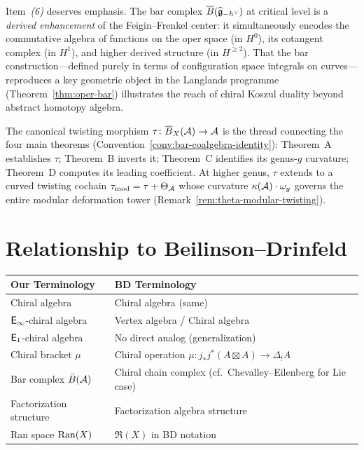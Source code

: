 \begin{remark}%
\label{rem:oper-langlands-concordance}
%
%
Item~\emph{(6)} deserves emphasis.  The bar complex
$\overline{B}(\widehat{\mathfrak{g}}_{-h^\vee})$ at critical level is a
\emph{derived enhancement} of the Feigin--Frenkel center: it
simultaneously encodes the commutative algebra of functions on
the oper space (in $H^0$), its cotangent complex (in $H^1$),
and higher derived structure (in $H^{\geq 2}$).  That the
bar construction---defined purely in terms of configuration
space integrals on curves---reproduces a key geometric
object in the Langlands programme
(Theorem~\ref{thm:oper-bar}) illustrates the reach of
chiral Koszul duality beyond abstract homotopy algebra.
\end{remark}

\begin{remark}
\label{rem:tau-protagonist}
The canonical twisting morphism $\tau \colon \overline{B}_X(\mathcal{A}) \to \mathcal{A}$
is the thread connecting the four main theorems
(Convention~\ref{conv:bar-coalgebra-identity}):
Theorem~A establishes $\tau$; Theorem~B inverts it;
Theorem~C identifies its genus-$g$ curvature; Theorem~D computes
its leading coefficient.
At higher genus, $\tau$ extends to a curved twisting cochain
$\tau_{\mathrm{mod}} = \tau + \Theta_{\mathcal{A}}$
whose curvature $\kappa(\mathcal{A})\cdot\omega_g$ governs the entire
modular deformation tower
(Remark~\ref{rem:theta-modular-twisting}).
\end{remark}

\section{Relationship to Beilinson--Drinfeld}

\begin{tabular}{>{\raggedright\arraybackslash}p{}>{\raggedright\arraybackslash}p{}}
\textbf{Our Terminology} & \textbf{BD Terminology} \\
\hline
Chiral algebra & Chiral algebra (same) \\
$\mathsf{E}_{\infty}$-chiral algebra & Vertex algebra / Chiral algebra \\
$\mathsf{E}_1$-chiral algebra & No direct analog (generalization) \\
Chiral bracket $\mu$ & Chiral operation $\mu: j_* j^*(A \boxtimes A) \to \Delta_! A$ \\
Bar complex $\bar{B}(\mathcal{A})$ & Chiral chain complex (cf.\ Chevalley--Eilenberg for Lie case) \\
Factorization structure & Factorization algebra structure \\
Ran space $\operatorname{Ran}(X)$ & $\mathfrak{R}(X)$ in BD notation \\
\end{tabular}

